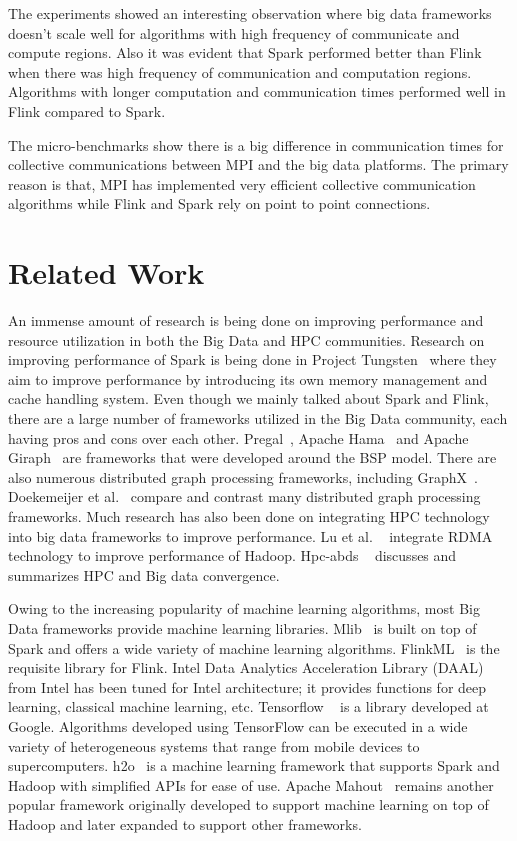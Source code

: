 \documentclass[conference]{IEEEtran}
\begin{document}
The experiments showed an interesting observation where big data frameworks doesn't scale well for algorithms with high frequency of communicate and compute regions. Also it was evident that Spark performed better than Flink when there was high frequency of communication and computation regions. Algorithms with longer computation and communication times performed well in Flink compared to Spark.

The micro-benchmarks show there is a big difference in communication times for collective communications between MPI and the big data platforms. The primary reason is that, MPI has implemented very efficient collective communication algorithms while Flink and Spark rely on point to point connections.

\section{Related Work} \label{related}

An immense amount of research is being done on improving performance and resource utilization in both the Big Data and HPC communities. Research on improving performance of Spark is being done in Project Tungsten~\cite{tungsten} where they aim to improve performance by introducing its own memory management and cache handling system. Even though we mainly talked about Spark and Flink, there are a large number of frameworks utilized in the Big Data community, each having pros and cons over each other. Pregal~\cite{malewicz2010pregel}, Apache Hama~\cite{seo2010hama} and Apache Giraph~\cite{Giraph} are frameworks that were developed around the BSP model. There are also numerous distributed graph processing frameworks, including GraphX~\cite{gonzalez2014graphx}. Doekemeijer et al.~\cite{doekemeijer2014survey} compare and contrast many distributed graph processing frameworks. Much research has also been done on integrating HPC technology into big data frameworks to improve performance. Lu et al. ~\cite{lu2013high} integrate RDMA technology to improve performance of Hadoop. Hpc-abds ~\cite{7152592} discusses and summarizes HPC and Big data convergence.   

Owing to the increasing popularity of machine learning algorithms, most Big Data frameworks provide machine learning libraries. Mlib~\cite{meng2016mllib} is built on top of Spark and offers a wide variety of machine learning algorithms. FlinkML~\cite{carbone2015lightweight} is the requisite library for Flink. Intel Data Analytics Acceleration Library (DAAL)~\cite{inteldaal} from Intel has been tuned for Intel architecture; it provides functions for deep learning, classical machine learning, etc. Tensorflow ~\cite{abadi2016tensorflow} is a library developed at Google. Algorithms developed using TensorFlow can be executed in a wide variety of heterogeneous systems that range from mobile devices to supercomputers. h2o~\cite{h2omachinelear} is a machine learning framework that supports Spark and Hadoop with simplified APIs for ease of use. Apache Mahout~\cite{owen2012mahout} remains another popular framework originally developed to support machine learning on top of Hadoop and later expanded to support other frameworks.
\end{document}
